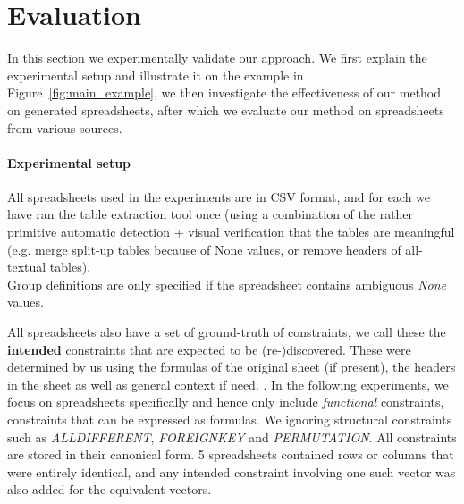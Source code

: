
\newcommand{\runtotal}{16.12}
\newcommand{\runtotalstd}{0.62}

\newcommand{\runfile}{0.50}
\newcommand{\runfilestd}{0.02}

\newcommand{\benchsize}{??}

\section{Evaluation}\label{sec:evaluation}
In this section we experimentally validate our approach.
We first explain the experimental setup and illustrate it on the example in Figure~\ref{fig:main_example}, we then investigate the effectiveness of our method on generated spreadsheets, after which we evaluate our method on spreadsheets from various sources.

\paragraph{Experimental setup}
\label{sec:evalualtion:method}
All spreadsheets used in the experiments are in CSV format, and for each we have ran the table extraction tool once (using a combination of the rather primitive automatic detection + visual verification that the tables are meaningful (e.g. merge split-up tables because of None values, or remove headers of all-textual tables). \\ %
Group definitions are only specified if the spreadsheet contains ambiguous \textit{None} values.  

All spreadsheets also have a set of ground-truth of constraints, we call these the \textbf{intended} constraints that are expected to be (re-)discovered.
These were determined by us using the formulas of the original sheet (if present), the headers in the sheet as well as general context if need. .
In the following experiments, we focus on spreadsheets specifically and hence only include \textit{functional} constraints, constraints that can be expressed as formulas. We ignoring structural constraints such as \textit{ALLDIFFERENT}, \textit{FOREIGNKEY} and \textit{PERMUTATION}. All constraints are stored in their canonical form. 5 spreadsheets contained rows or columns that were entirely identical, and any intended constraint involving one such vector was also added for the equivalent vectors.

